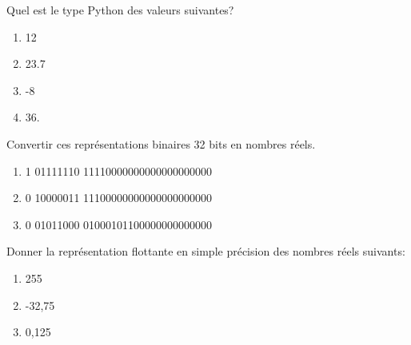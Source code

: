 \documentclass[a4paper,11pt]{article}
\begin{document}
\begin{Form}
\begin{exo}
Quel est le type Python des valeurs suivantes?
\begin{enumerate}
\item 12
\item 23.7
\item -8
\item 36.
\end{enumerate}
\end{exo}
\begin{exo}
Convertir ces représentations binaires 32 bits en nombres réels.
\begin{enumerate}
\item 1 01111110 11110000000000000000000
\item 0 10000011 11100000000000000000000
\item 0 01011000 01000101100000000000000
\end{enumerate}
\end{exo}
\begin{exo}
Donner la représentation flottante en simple précision des nombres réels suivants:
\begin{enumerate}
\item 255
\item -32,75
\item 0,125
\end{enumerate}
\end{exo}
\end{Form}
\end{document}

